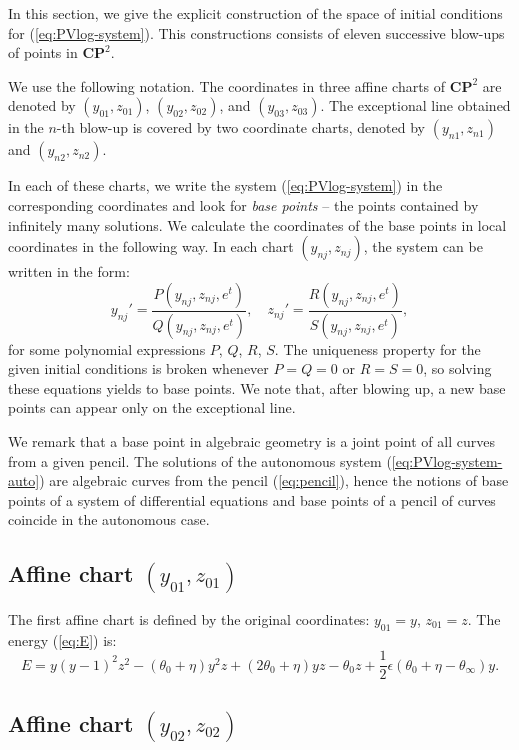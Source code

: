 In this section, we give the explicit construction of the space of initial conditions for (\ref{eq:PVlog-system}).
This constructions consists of eleven successive blow-ups of points in $\mathbf{CP}^2$.

We use the following notation.
The coordinates in three affine charts of $\mathbf{CP}^2$ are denoted by $(y_{01},z_{01})$,  $(y_{02},z_{02})$, and  $(y_{03},z_{03})$.
The exceptional line obtained in the $n$-th blow-up is covered by two coordinate charts, denoted by $(y_{n1},z_{n1})$ and $(y_{n2},z_{n2})$.

In each of these charts, we write the system (\ref{eq:PVlog-system}) in the corresponding coordinates and look for \emph{base points} -- the points contained by infinitely many solutions.
We calculate the coordinates of the base points in local coordinates in the following way.
In each chart $(y_{nj},z_{nj})$, the system can be written in the form:
$$
y_{nj}'=\frac{P(y_{nj},z_{nj},e^t)}{Q(y_{nj},z_{nj},e^t)},
\quad
z_{nj}'=\frac{R(y_{nj},z_{nj},e^t)}{S(y_{nj},z_{nj},e^t)},
$$
for some polynomial expressions $P$, $Q$, $R$, $S$.
The uniqueness property for the given initial conditions is broken whenever $P=Q=0$ or $R=S=0$,
so solving these equations yields to base points.
We note that, after blowing up, a new base points can appear only on the exceptional line.

We remark that a base point in algebraic geometry is a joint point of all curves from a given pencil.
The solutions of the autonomous system (\ref{eq:PVlog-system-auto}) are algebraic curves from the pencil (\ref{eq:pencil}), hence the notions of base points of a system of differential equations and base points of a pencil of curves coincide in the autonomous case.





\subsection{Affine chart $(y_{01},z_{01})$}\label{chart01}
The first affine chart is defined by the original coordinates:
$y_{01}=y$,
$z_{01}=z$.
The energy (\ref{eq:E}) is:
$$
 E=y(y-1)^2z^2-(\theta_0+\eta)y^2z+(2\theta_0+\eta)yz-\theta_0z+\frac12\epsilon(\theta_0+\eta-\theta_{\infty})y.
$$

\subsection{Affine chart $(y_{02},z_{02})$}\label{chart02}


